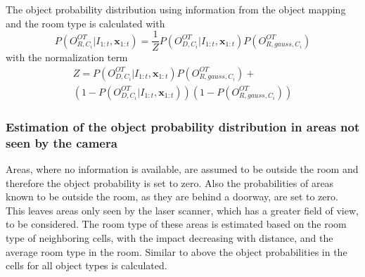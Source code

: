 The object probability distribution using information from the object mapping and the room type is calculated with
\begin{equation}
P(O_{R,C_i}^{OT}|I_{1:t},\mathbf{x}_{1:t})=\frac{1}{Z}P(O_{D,C_i}^{OT}|I_{1:t},\mathbf{x}_{1:t})P(O_{R,gauss,C_i}^{OT})
\end{equation}
with the normalization term
\begin{multline}
Z=P(O_{D,C_i}^{OT}|I_{1:t},\mathbf{x}_{1:t})P(O_{R,gauss,C_i}^{OT})+\\(1-P(O_{D,C_i}^{OT}|I_{1:t},\mathbf{x}_{1:t}))(1-P(O_{R,gauss,C_i}^{OT}))
\end{multline} 

\subsubsection{Estimation of the object probability distribution in areas not seen by the camera}

Areas, where no information is available, are assumed to be outside the room and therefore the object probability is set to zero. Also the probabilities of areas known to be outside the room, as they are behind a doorway, are set to zero. This leaves areas only seen by the laser scanner, which has a greater field of view, to be considered. The room type of these areas is estimated based on the room type of neighboring cells, with the impact decreasing with distance, and the average room type in the room. Similar to above the object probabilities in the cells for all object types is calculated. 